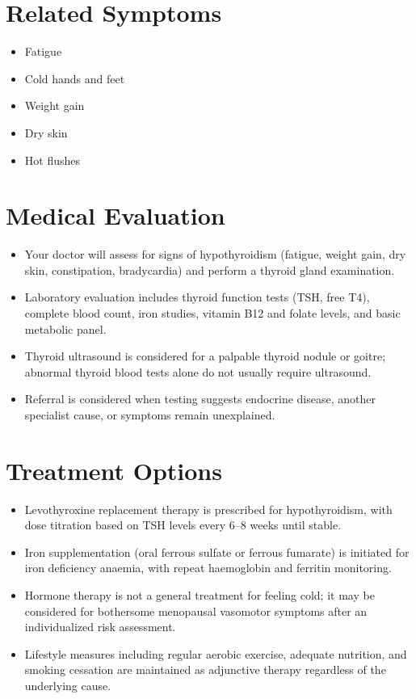 \section*{Related Symptoms}
\begin{itemize}
  \item Fatigue
  \item Cold hands and feet
  \item Weight gain
  \item Dry skin
  \item Hot flushes
\end{itemize}


\section*{Medical Evaluation}
\begin{itemize}
  \item Your doctor will assess for signs of hypothyroidism (fatigue, weight gain, dry skin, constipation, bradycardia) and perform a thyroid gland examination.
  \item Laboratory evaluation includes thyroid function tests (TSH, free T4), complete blood count, iron studies, vitamin B12 and folate levels, and basic metabolic panel.
  \item Thyroid ultrasound is considered for a palpable thyroid nodule or goitre; abnormal thyroid blood tests alone do not usually require ultrasound.
  \item Referral is considered when testing suggests endocrine disease, another specialist cause, or symptoms remain unexplained.
\end{itemize}

\section*{Treatment Options}
\begin{itemize}
  \item Levothyroxine replacement therapy is prescribed for hypothyroidism, with dose titration based on TSH levels every 6–8 weeks until stable.
  \item Iron supplementation (oral ferrous sulfate or ferrous fumarate) is initiated for iron deficiency anaemia, with repeat haemoglobin and ferritin monitoring.
  \item Hormone therapy is not a general treatment for feeling cold; it may be considered for bothersome menopausal vasomotor symptoms after an individualized risk assessment.
  \item Lifestyle measures including regular aerobic exercise, adequate nutrition, and smoking cessation are maintained as adjunctive therapy regardless of the underlying cause.
\end{itemize}

